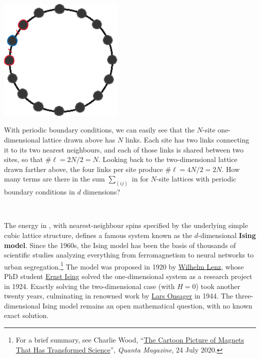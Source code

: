 \begin{center}\includegraphics[width=0.45\textwidth]{figs/week10_lattice_1d.pdf}\end{center}

With periodic boundary conditions, we can easily see that the $N$-site one-dimensional lattice drawn above has $N$ links.
Each site has two links connecting it to its two nearest neighbours, and each of those links is shared between two sites, so that $\#\ell = 2N / 2 = N$.
Looking back to the two-dimensional lattice drawn farther above, the four links per site produce $\#\ell = 4N / 2 = 2N$.
How many terms are there in the sum $\sum_{(ij)}$ in  for $N$-site lattices with periodic boundary conditions in $d$ dimensions?
\begin{mdframed}
  \ \\[50 pt]
\end{mdframed}

The energy in , with nearest-neighbour spins specified by the underlying simple cubic lattice structure, defines a famous system known as the $d$-dimensional \textbf{Ising model}.
Since the 1960s, the Ising model has been the basis of thousands of scientific studies analyzing everything from ferromagnetism to neural networks to urban segregation.\footnote{For a brief summary, see Charlie Wood, ``\href{https://www.quantamagazine.org/the-cartoon-picture-of-magnets-that-has-transformed-science-20200624/}{The Cartoon Picture of Magnets That Has Transformed Science}'', \textit{Quanta Magazine}, 24 July 2020.}
The model was proposed in 1920 by \href{https://en.wikipedia.org/wiki/Wilhelm_Lenz}{Wilhelm Lenz}, whose PhD student \href{https://en.wikipedia.org/wiki/Ernst_Ising}{Ernst Ising} solved the one-dimensional system as a research project in 1924.
Exactly solving the two-dimensional case (with $H = 0$) took another twenty years, culminating in renowned work by \href{https://en.wikipedia.org/wiki/Lars_Onsager}{Lars Onsager} in 1944.
The three-dimensional Ising model remains an open mathematical question, with no known exact solution.

